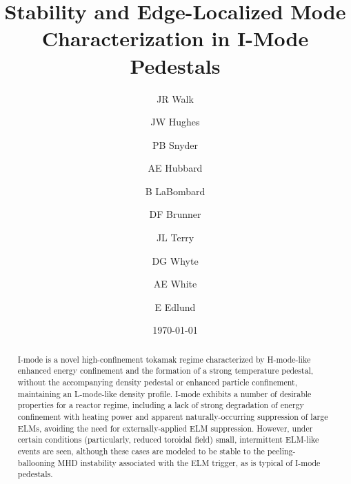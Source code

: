\documentclass[12pt,floatfix,showpacs]{revtex4-1}
\begin{document}
\title{Stability and Edge-Localized Mode Characterization in I-Mode Pedestals}

\author{JR Walk}

\author{JW Hughes}

\author{PB Snyder}

\author{AE Hubbard}

\author{B LaBombard}

\author{DF Brunner}

\author{JL Terry}

\author{DG Whyte}

\author{AE White}

\author{E Edlund}

\date{\today}

\begin{abstract}
I-mode is a novel high-confinement tokamak regime characterized by H-mode-like enhanced energy confinement and the formation of a strong temperature pedestal, without the accompanying density pedestal or enhanced particle confinement, maintaining an L-mode-like density profile.  I-mode exhibits a number of desirable properties for a reactor regime, including a lack of strong degradation of energy confinement with heating power and apparent naturally-occurring suppression of large ELMs, avoiding the need for externally-applied ELM suppression.  However, under certain conditions (particularly, reduced toroidal field) small, intermittent ELM-like events are seen, although these cases are modeled to be stable to the peeling-ballooning MHD instability associated with the ELM trigger, as is typical of I-mode pedestals.
\end{abstract}


\maketitle

\end{document}
